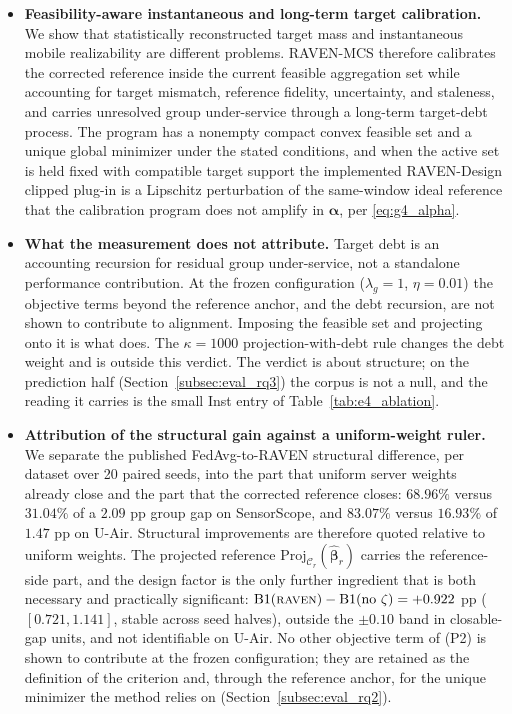 \documentclass[letterpaper,journal]{IEEEtran}
\begin{document}
\begin{itemize}
    \item \textbf{Feasibility-aware instantaneous and long-term target
    calibration.}
    We show that statistically reconstructed target mass and instantaneous
    mobile realizability are different problems.  RAVEN-MCS therefore calibrates
    the corrected reference inside the current feasible aggregation set while
    accounting for target mismatch, reference fidelity, uncertainty, and
    staleness, and carries unresolved group under-service through a long-term
    target-debt process.  The program has a nonempty compact convex
    feasible set and a unique global minimizer under the stated conditions, and
    when the active set is held fixed with compatible target support the
    implemented RAVEN-Design clipped plug-in is a Lipschitz perturbation of the
    same-window ideal reference that the calibration program does not amplify in
    $\boldsymbol\alpha$, per \eqref{eq:g4_alpha}.

    \item \textbf{What the measurement does not attribute.}
    Target debt is an accounting recursion for residual group under-service, not
    a standalone performance contribution.  At the frozen
    configuration ($\lambda_g=1$, $\eta=0.01$) the objective terms beyond the
    reference anchor, and the debt recursion, are not
    shown to contribute to alignment.  Imposing the feasible set and projecting
    onto it is what does.  The $\kappa=1000$
    projection-with-debt rule changes the debt weight and is outside this
    verdict.  The verdict is about structure; on the prediction half
    (Section~\ref{subsec:eval_rq3}) the corpus is not a null, and the reading it
    carries is the small Inst entry of Table~\ref{tab:e4_ablation}.

    \item \textbf{Attribution of the structural gain against a uniform-weight
    ruler.}
    We separate the published FedAvg-to-RAVEN structural difference, per dataset
    over 20 paired seeds, into the part that uniform server weights already close
    and the part that the corrected reference closes: $68.96\%$ versus $31.04\%$
    of a $2.09$ pp group gap on SensorScope, and $83.07\%$ versus $16.93\%$ of
    $1.47$ pp on U-Air.  Structural improvements are therefore quoted relative to
    uniform weights.  The projected reference
    $\mathrm{Proj}_{\mathcal{C}_r}(\widehat{\boldsymbol\beta}_r)$ carries the
    reference-side part, and the design factor is the only further ingredient
    that is both necessary and practically significant:
    $\mathrm{B1}(\textsc{raven})-\mathrm{B1}(\text{no }\zeta)=+0.922$ pp
    ($[0.721,1.141]$, stable across seed halves), outside the $\pm0.10$ band in
    closable-gap units, and not identifiable on U-Air.  No other objective term
    of (P2) is shown to contribute at the frozen configuration; they are retained
    as the definition of the criterion and, through the reference anchor, for the
    unique minimizer the method relies on (Section~\ref{subsec:eval_rq2}).
\end{itemize}
\end{document}
